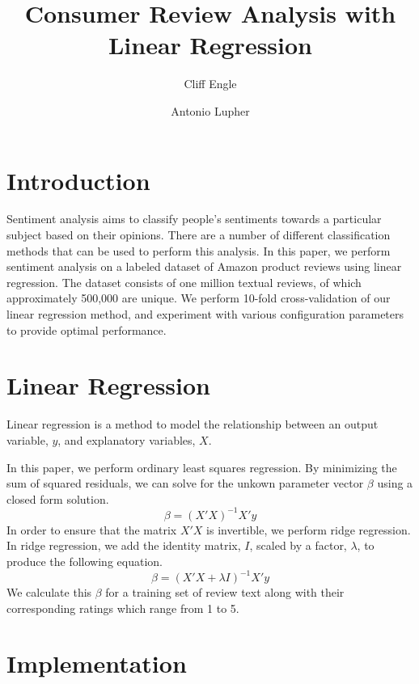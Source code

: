 \documentclass{article}
\title{Consumer Review Analysis with Linear Regression}
\author{Cliff Engle \and Antonio Lupher}
\begin{document}

\maketitle

\section{Introduction}
Sentiment analysis aims to classify people's sentiments towards a particular subject based on their opinions. There are a number of different classification methods that can be used to perform this analysis. In this paper, we perform sentiment analysis on a labeled dataset of Amazon product reviews using linear regression. The dataset consists of one million textual reviews, of which approximately 500,000 are unique. We perform 10-fold cross-validation of our linear regression method, and experiment with various configuration parameters to provide optimal performance.

\section{Linear Regression}
Linear regression is a method to model the relationship between an output variable, $y$, and explanatory variables, $X$. 

In this paper, we perform ordinary least squares regression. By minimizing the sum of squared residuals, we can solve for the unkown parameter vector $\beta$ using a closed form solution. $$\beta=(X'X)^{-1}X'y$$ In order to ensure that the matrix $X'X$ is invertible, we perform ridge regression. In ridge regression, we add the identity matrix, $I$, scaled by a factor, $\lambda$, to produce the following equation. $$\beta=(X'X+\lambda I)^{-1}X'y$$ We calculate this $\beta$ for a training set of review text along with their corresponding ratings which range from 1 to 5.


\section{Implementation}
\end{document}

